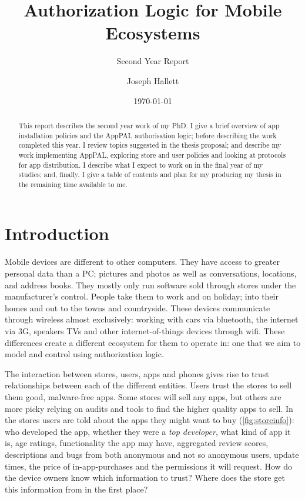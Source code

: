 \documentclass[a4paper]{scrartcl}
\title{Authorization Logic for Mobile Ecosystems}
\subtitle{Second Year Report}
\author{Joseph Hallett}
\date\today
\begin{document}
\maketitle

\begin{abstract}
  This report describes the second year work of my PhD.
  I give a brief overview of app installation policies and the AppPAL authorisation logic; before describing the work completed this year.
  I review topics suggested in the thesis proposal; and describe my work implementing AppPAL, exploring store and user policies and looking at protocols for app distribution.
  I describe what I expect to work on in the final year of my studies; and, finally, I give a table of contents and plan for my producing my thesis in the remaining time available to me.
\end{abstract}

\section{Introduction}

Mobile devices are different to other computers.
They have access to greater personal data than a PC; pictures and photos as well as conversations, locations, and address books.
They mostly only run software sold through stores under the manufacturer's control.
People take them to work and on holiday; into their homes and out to the towns and countryside.
These devices communicate through wireless almost exclusively: working with cars via bluetooth, the internet via 3G, speakers TVs and other internet-of-things devices through wifi.
These differences create a different ecosystem for them to operate in: one that we aim to model and control using authorization logic.

The interaction between stores, users, apps and phones gives rise to trust relationships between each of the different entities.
Users trust the stores to sell them good, malware-free apps.
Some stores will sell any apps, but others are more picky relying on audits and tools to find the higher quality apps to sell.
In the stores users are told about the apps they might want to buy (\autoref{fig:storeinfo}):
who developed the app, whether they were a \emph{top developer}, what kind of app it is, age ratings, functionality the app may have, aggregated review scores, descriptions and bugs from both anonymous and not so anonymous users, update times, the price of in-app-purchases and the permissions it will request.
How do the device owners know which information to trust?
Where does the store get this information from in the first place?
\end{document}
